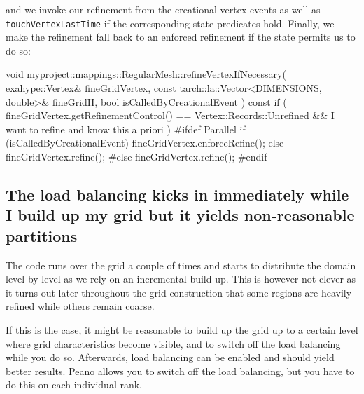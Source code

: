 \noindent
and we invoke our refinement from the creational vertex events as well as
\texttt{touchVertexLastTime} if the corresponding state predicates hold.
Finally, we make the refinement fall back to an enforced refinement if the state
permits us to do so:
\begin{code}
void myproject::mappings::RegularMesh::refineVertexIfNecessary(
  exahype::Vertex&                              fineGridVertex,
  const tarch::la::Vector<DIMENSIONS, double>&  fineGridH,
  bool                                          isCalledByCreationalEvent
) const {
  if (
    fineGridVertex.getRefinementControl() == Vertex::Records::Unrefined
    &&
    I want to refine and know this a priori
  ) {
    #ifdef Parallel
    if (isCalledByCreationalEvent) {
      fineGridVertex.enforceRefine();
    }
    else {
      fineGridVertex.refine();
    }
    #else
    fineGridVertex.refine();
    #endif
  }
}
\end{code}






\subsection{The load balancing kicks in immediately while I build up my grid but it
yields non-reasonable partitions}


\begin{smell}
The code runs over the grid a couple of times and starts to distribute the
domain level-by-level as we rely on an incremental build-up. This is however not
clever as it turns out later throughout the grid construction that some regions
are heavily refined while others remain coarse.
\end{smell}


\noindent
If this is the case, it might be reasonable to build up the grid up to a certain
level where grid characteristics become visible, and to switch off the load
balancing while you do so.
Afterwards, load balancing can be enabled and should yield better results. 
Peano allows you to switch off the load balancing, but you have to do this on
each individual rank. 

